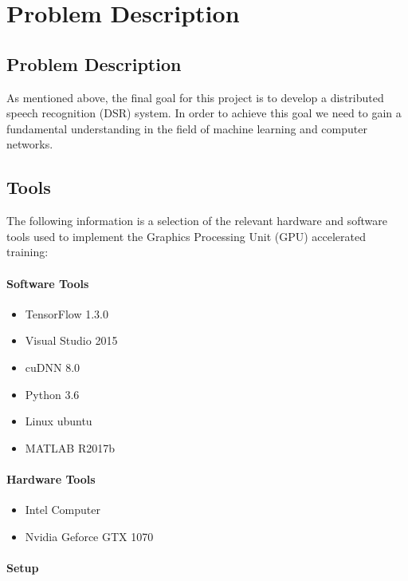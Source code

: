 \chapter{Problem Description}\label{ch:problem_description}
\section{Problem Description}

As mentioned above, the final goal for this project is to develop a distributed speech recognition (DSR) system.
In order to achieve this goal we need to gain a fundamental understanding in the field of machine learning and computer networks.\\

\section{Tools}
The following information is a selection of the relevant hardware and software tools used to implement the Graphics Processing Unit (GPU) accelerated training:
\subsubsection{Software Tools}
\begin{itemize}
	\item TensorFlow 1.3.0
	\item Visual Studio 2015
	\item cuDNN 8.0
	\item Python 3.6
	\item Linux ubuntu
	\item MATLAB  R2017b
\end{itemize}

\subsubsection{Hardware Tools}
\begin{itemize}
	\item Intel Computer
	\item Nvidia Geforce GTX 1070 \\
\end{itemize}

\subsubsection{Setup}

